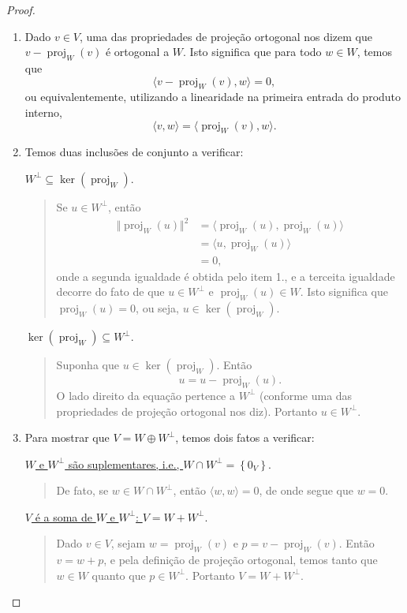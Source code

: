 \begin{proof}
	\begin{enumerate}
		\item Dado $v\in V$, uma das propriedades de projeção ortogonal nos dizem que $v-\operatorname{proj}_W(v)$ é ortogonal a $W$. Isto significa que para todo $w\in W$, temos que
		\[\langle v-\operatorname{proj}_W(v),w\rangle=0,\]
		ou equivalentemente, utilizando a linearidade na primeira entrada do produto interno,
		\[\langle v,w\rangle=\langle\operatorname{proj}_W(v),w\rangle.\]
		
		\item Temos duas inclusões de conjunto a verificar:
		
		\uline{$W^\perp\subseteq\ker(\operatorname{proj}_W)$}.
		\begin{quote}
			Se $u\in W^\perp$, então
			\begin{align*}
				\Vert \operatorname{proj}_W(u)\Vert^2
					&=\langle\operatorname{proj}_W(u),\operatorname{proj}_W(u)\rangle\\
					&=\langle u,\operatorname{proj}_W(u)\rangle\\
					&=0,
			\end{align*}
			onde a segunda igualdade é obtida pelo item 1., e a terceita igualdade decorre do fato de que $u\in W^\perp$ e $\operatorname{proj}_W(u)\in W$. Isto significa que $\operatorname{proj}_W(u)=0$, ou seja, $u\in\ker(\operatorname{proj}_W)$.
		\end{quote}
		
		\uline{$\ker(\operatorname{proj}_W)\subseteq W^\perp$}.
		\begin{quote}
			Suponha que $u\in\ker(\operatorname{proj}_W)$. Então
			\[u=u-\operatorname{proj}_W(u).\]
			O lado direito da equação pertence a $W^\perp$ (conforme uma das propriedades de projeção ortogonal nos diz). Portanto $u\in W^\perp$.
		\end{quote}
		
		\item Para mostrar que $V=W\oplus W^\perp$, temos dois fatos a verificar:
		
		\uline{$W$ e $W^\perp$ são suplementares, i.e., $W\cap W^\perp=\left\{0_V\right\}$}.
		\begin{quote}
			De fato, se $w\in W\cap W^\perp$, então $\langle w,w\rangle=0$, de onde segue que $w=0$.
		\end{quote}
	
		\uline{$V$ é a soma de $W$ e $W^\perp$: $V=W+W^\perp$}.
	
		\begin{quote}
			Dado $v\in V$, sejam $w=\operatorname{proj}_W(v)$ e $p=v-\operatorname{proj}_W(v)$. Então $v=w+p$, e pela definição de projeção ortogonal, temos tanto que $w\in W$ quanto que $p\in W^\perp$. Portanto $V=W+W^\perp$.
		\end{quote}
		

\end{enumerate}
\end{proof}
